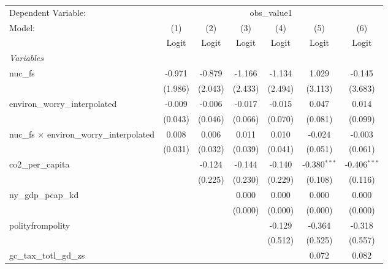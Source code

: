 
\begingroup
\centering
\begin{tabular}{lcccccc}
   \toprule
   Dependent Variable: & \multicolumn{6}{c}{obs\_value1}\\
   Model:                                            & (1)     & (2)     & (3)     & (4)     & (5)            & (6)\\  
                                                     &  Logit  & Logit   & Logit   & Logit   & Logit          & Logit\\  
   \midrule
   \emph{Variables}\\
   nuc\_fs                                           & -0.971  & -0.879  & -1.166  & -1.134  & 1.029          & -0.145\\   
                                                     & (1.986) & (2.043) & (2.433) & (2.494) & (3.113)        & (3.683)\\   
   environ\_worry\_interpolated                      & -0.009  & -0.006  & -0.017  & -0.015  & 0.047          & 0.014\\   
                                                     & (0.043) & (0.046) & (0.066) & (0.070) & (0.081)        & (0.099)\\   
   nuc\_fs $\times$ environ\_worry\_interpolated     & 0.008   & 0.006   & 0.011   & 0.010   & -0.024         & -0.003\\   
                                                     & (0.031) & (0.032) & (0.039) & (0.041) & (0.051)        & (0.061)\\   
   co2\_per\_capita                                  &         & -0.124  & -0.144  & -0.140  & -0.380$^{***}$ & -0.406$^{***}$\\   
                                                     &         & (0.225) & (0.230) & (0.229) & (0.108)        & (0.116)\\   
   ny\_gdp\_pcap\_kd                                 &         &         & 0.000   & 0.000   & 0.000          & 0.000\\   
                                                     &         &         & (0.000) & (0.000) & (0.000)        & (0.000)\\   
   polityfrompolity                                  &         &         &         & -0.129  & -0.364         & -0.318\\   
                                                     &         &         &         & (0.512) & (0.525)        & (0.557)\\   
   gc\_tax\_totl\_gd\_zs                             &         &         &         &         & 0.072          & 0.082\\   

\end{tabular}
